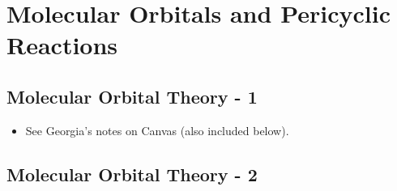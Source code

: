 \documentclass[../notes.tex]{subfiles}
\begin{document}
\chapter{Molecular Orbitals and Pericyclic Reactions}
\setcounter{section}{9}
\section{Molecular Orbital Theory - 1}
\begin{itemize}
    \item {}See Georgia's notes on Canvas (also included below).
\end{itemize}





\section{Molecular Orbital Theory - 2}
\end{document}
